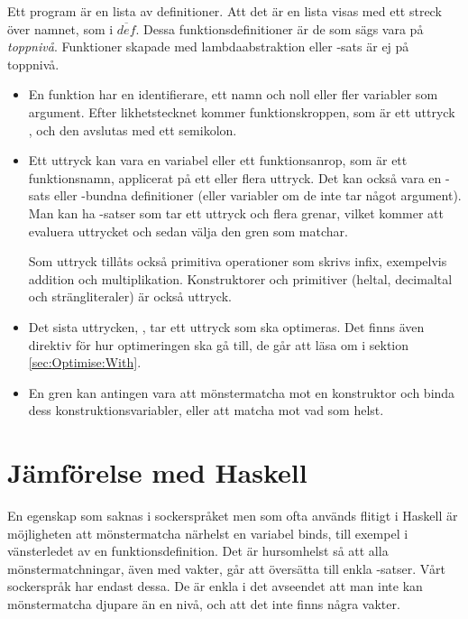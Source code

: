 \documentclass[Rapport]{subfiles}
\begin{document}
Ett program är en lista av definitioner. Att det är en lista visas med ett
streck över namnet, som i $\overline{def}$.
Dessa funktionsdefinitioner är de som sägs vara på \emph{toppnivå}. Funktioner 
skapade med lambdaabstraktion eller -sats är ej på toppnivå. 
\begin{itemize}
\item En funktion har en identifierare, ett namn och noll eller fler variabler som argument. Efter likhetstecknet
kommer funktionskroppen, som är ett uttryck , och den avslutas med
ett semikolon.

\item  Ett uttryck kan vara en variabel eller ett funktionsanrop, som är ett
funktionsnamn, applicerat på ett eller flera uttryck. Det kan också vara en -sats eller
-bundna definitioner (eller variabler om de inte tar något argument).
Man kan ha -satser som tar ett uttryck och flera grenar, vilket kommer
att evaluera uttrycket och sedan välja den gren som matchar.

Som uttryck tillåts också primitiva operationer som skrivs infix, exempelvis addition 
och multiplikation. Konstruktorer och primitiver (heltal, decimaltal och strängliteraler) är också uttryck.


\item  Det sista uttrycken, , tar ett uttryck som ska optimeras. Det finns även direktiv för hur optimeringen ska gå till, de går att läsa om i sektion \ref{sec:Optimise:With}.


\item En gren kan antingen vara att mönstermatcha mot en konstruktor och binda
dess konstruktionsvariabler, eller att matcha mot vad som helst.
\end{itemize}

\section{Jämförelse med Haskell}

    En egenskap som saknas i sockerspråket men som ofta används flitigt i Haskell är 
möjligheten att mönstermatcha närhelst en variabel binds, till exempel i vänsterledet
av en funktionsdefinition. Det är hursomhelst så att alla mönstermatchningar,
även med vakter, går att översätta till enkla -satser. Vårt sockerspråk
har endast dessa. De är enkla i det avseendet att man inte kan mönstermatcha djupare
än en nivå, och att det inte finns några vakter.
\end{document}
